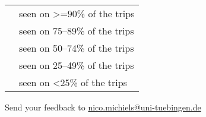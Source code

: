 \documentclass[a4paper]{article}
\newcommand{\abundanceAB}[1][]{%
    \Checkmark\Checkmark\Checkmark\Checkmark\Checkmark
}
\newcommand{\abundanceC}[1][]{%
    {\color{lightgray}\Checkmark}\Checkmark\Checkmark\Checkmark\Checkmark
}
\newcommand{\abundanceD}[1][]{%
    {\color{lightgray}\Checkmark\Checkmark}\Checkmark\Checkmark\Checkmark
}
\newcommand{\abundanceE}[1][]{%
    {\color{lightgray}\Checkmark\Checkmark\Checkmark}\Checkmark\Checkmark
}
\newcommand{\abundanceFH}[1][]{%
    {\color{lightgray}\Checkmark\Checkmark\Checkmark\Checkmark}\Checkmark
}
\begin{document}
\begin{center}
    \begin{tabular}{l l}
        \footnotesize{\abundanceAB}
        & seen on >=90\% of the trips \\
        \footnotesize{\abundanceC}
        & seen on 75--89\% of the trips \\
        \footnotesize{\abundanceD}
        & seen on 50--74\% of the trips \\
        \footnotesize{\abundanceE}
        & seen on 25--49\% of the trips \\
        \footnotesize{\abundanceFH}
        & seen on <25\% of the trips \\  
    \end{tabular}
\end{center}

\bigskip

Send your feedback to \href{mailto:nico.michiels@uni-tuebingen.de}{nico.michiels@uni-tuebingen.de}




\newpage





\makeatletter
\renewcommand{\cftsecpresnum}{\begin{lrbox}{\@tempboxa}}
\renewcommand{\cftsecaftersnum}{\end{lrbox}}
\makeatother
\setlength{\cftsecnumwidth}{0pt}






\hypertarget{tableofcontents}{}



\setlength{\cftbeforesecskip}{0.7\baselineskip}

\renewcommand{\contentsname}{Table of contents}

\small{\tableofcontents}

\singlespacing


\newpage
\end{document}
